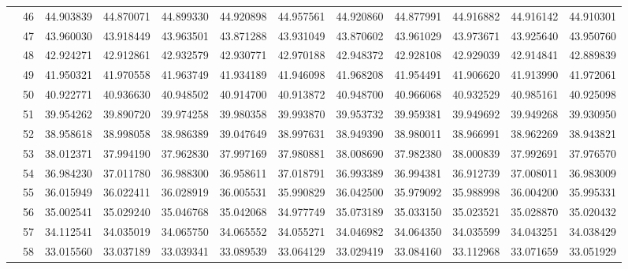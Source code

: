 \begin{table}[h]
{\begin{tabular}{cc|cccccccccc}
\multicolumn{1}{|c|}{} & 46 & 44.903839 & 44.870071 & 44.899330 & 44.920898 & 44.957561 & 44.920860 & 44.877991 & 44.916882 & 44.916142 & 44.910301 \\ \cline{2-2}
\multicolumn{1}{|c|}{} & 47 & 43.960030 & 43.918449 & 43.963501 & 43.871288 & 43.931049 & 43.870602 & 43.961029 & 43.973671 & 43.925640 & 43.950760 \\ \cline{2-2}
\multicolumn{1}{|c|}{} & 48 & 42.924271 & 42.912861 & 42.932579 & 42.930771 & 42.970188 & 42.948372 & 42.928108 & 42.929039 & 42.914841 & 42.889839 \\ \cline{2-2}
\multicolumn{1}{|c|}{} & 49 & 41.950321 & 41.970558 & 41.963749 & 41.934189 & 41.946098 & 41.968208 & 41.954491 & 41.906620 & 41.913990 & 41.972061 \\ \cline{2-2}
\multicolumn{1}{|c|}{} & 50 & 40.922771 & 40.936630 & 40.948502 & 40.914700 & 40.913872 & 40.948700 & 40.966068 & 40.932529 & 40.985161 & 40.925098 \\ \cline{2-2}
\multicolumn{1}{|c|}{} & 51 & 39.954262 & 39.890720 & 39.974258 & 39.980358 & 39.993870 & 39.953732 & 39.959381 & 39.949692 & 39.949268 & 39.930950 \\ \cline{2-2}
\multicolumn{1}{|c|}{} & 52 & 38.958618 & 38.998058 & 38.986389 & 39.047649 & 38.997631 & 38.949390 & 38.980011 & 38.966991 & 38.962269 & 38.943821 \\ \cline{2-2}
\multicolumn{1}{|c|}{} & 53 & 38.012371 & 37.994190 & 37.962830 & 37.997169 & 37.980881 & 38.008690 & 37.982380 & 38.000839 & 37.992691 & 37.976570 \\ \cline{2-2}
\multicolumn{1}{|c|}{} & 54 & 36.984230 & 37.011780 & 36.988300 & 36.958611 & 37.018791 & 36.993389 & 36.994381 & 36.912739 & 37.008011 & 36.983009 \\ \cline{2-2}
\multicolumn{1}{|c|}{} & 55 & 36.015949 & 36.022411 & 36.028919 & 36.005531 & 35.990829 & 36.042500 & 35.979092 & 35.988998 & 36.004200 & 35.995331 \\ \cline{2-2}
\multicolumn{1}{|c|}{} & 56 & 35.002541 & 35.029240 & 35.046768 & 35.042068 & 34.977749 & 35.073189 & 35.033150 & 35.023521 & 35.028870 & 35.020432 \\ \cline{2-2}
\multicolumn{1}{|c|}{} & 57 & 34.112541 & 34.035019 & 34.065750 & 34.065552 & 34.055271 & 34.046982 & 34.064350 & 34.035599 & 34.043251 & 34.038429 \\ \cline{2-2}
\multicolumn{1}{|c|}{} & 58 & 33.015560 & 33.037189 & 33.039341 & 33.089539 & 33.064129 & 33.029419 & 33.084160 & 33.112968 & 33.071659 & 33.051929 \\ \cline{2-2}

\end{tabular}}
\end{table}
